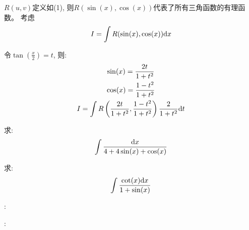 $R(u, v)$定义如(1), 则$R(\sin(x), \cos(x))$代表了所有三角函数的有理函数。
考虑
\begin{equation*}
    I = \int R(\sin(x), \cos(x)) \mathrm{d} x
\end{equation*}

令$\tan\left(\frac{x}{2}\right) = t$, 则:
\begin{gather*}
    \sin(x) = \frac{2t}{1+t^2} \\
    \cos(x) = \frac{1-t^2}{1+t^2} \\ 
    I = \int R\left(\frac{2t}{1+t^2}, \frac{1-t^2}{1+t^2}\right)\frac{2}{1+t^2}\mathrm{d} t
\end{gather*}

\begin{example}
    求:
    \begin{equation*}
        \int \frac{\mathrm{d} x}{4 + 4\sin(x)+\cos(x)}
    \end{equation*}
\end{example}

\begin{example}
    求:
    \begin{equation*}
        \int \frac{\cot(x) \mathrm{d} x}{1+ \sin(x)} 
    \end{equation*}
\end{example}
\begin{solution}
    :

    :
\end{solution}

